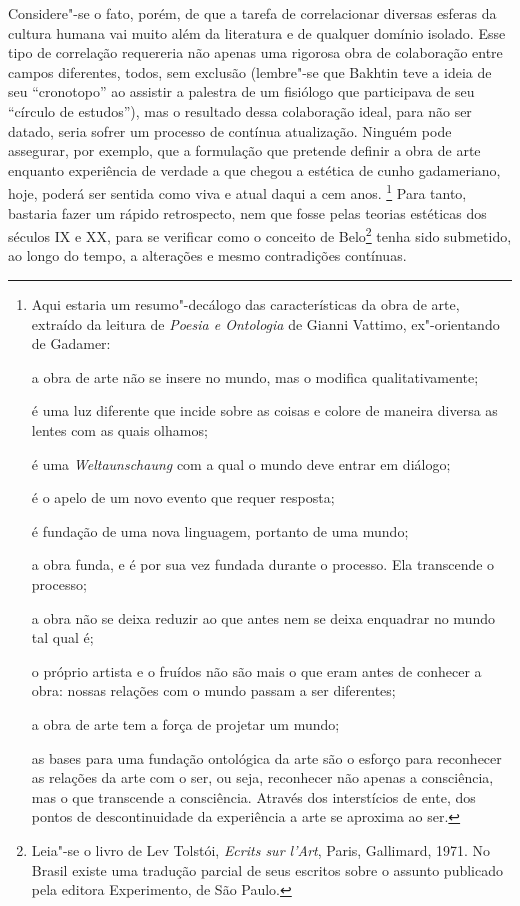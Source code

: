 Considere"-se o fato, porém, de que a tarefa de correlacionar diversas
esferas da cultura humana vai muito além da literatura e de qualquer
domínio isolado. Esse tipo de correlação requereria não apenas uma
rigorosa obra de colaboração entre campos diferentes, todos, sem
exclusão (lembre"-se que Bakhtin teve a ideia de seu ``cronotopo'' ao
assistir a palestra de um fisiólogo que participava de seu ``círculo de
estudos''), mas o resultado dessa colaboração ideal, para não ser
datado, seria sofrer um processo de contínua atualização. Ninguém pode
assegurar, por exemplo, que a formulação que pretende definir a obra de
arte enquanto experiência de verdade a que chegou a estética de cunho
gadameriano, hoje, poderá ser sentida como viva e atual daqui a cem
anos. \footnote{Aqui estaria um resumo"-decálogo das características da
  obra de arte, extraído da leitura de \emph{Poesia e Ontologia} de
  Gianni Vattimo, ex"-orientando de Gadamer:

  a obra de arte não se insere no mundo, mas o modifica
  qualitativamente;

  é uma luz diferente que incide sobre as coisas e colore de maneira
  diversa as lentes com as quais olhamos;

  é uma \emph{Weltaunschaung} com a qual o mundo deve entrar em diálogo;

  é o apelo de um novo evento que requer resposta;

  é fundação de uma nova linguagem, portanto de uma mundo;

  a obra funda, e é por sua vez fundada durante o processo. Ela
  transcende o processo;

  a obra não se deixa reduzir ao que antes nem se deixa enquadrar no
  mundo tal qual é;

  o próprio artista e o fruídos não são mais o que eram antes de
  conhecer a obra: nossas relações com o mundo passam a ser diferentes;

  a obra de arte tem a força de projetar um mundo;

  as bases para uma fundação ontológica da arte são o esforço para
  reconhecer as relações da arte com o ser, ou seja, reconhecer não
  apenas a consciência, mas o que transcende a consciência. Através dos
  interstícios de ente, dos pontos de descontinuidade da experiência a
  arte se aproxima ao ser.} Para tanto, bastaria fazer um rápido
retrospecto, nem que fosse pelas teorias estéticas dos séculos IX e XX,
para se verificar como o conceito de Belo\footnote{Leia"-se o livro de
  Lev Tolstói, \emph{Ecrits sur l'Art}, Paris, Gallimard, 1971. No
  Brasil existe uma tradução parcial de seus escritos sobre o assunto
  publicado pela editora Experimento, de São Paulo.} tenha sido
submetido, ao longo do tempo, a alterações e mesmo contradições
contínuas.

